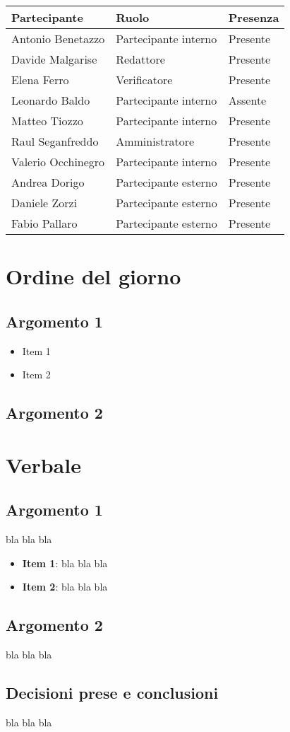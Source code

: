 \documentclass[italian,12pt]{article}
\begin{document}
\begin{flushleft}
	\begin{table}[!h]
	\begin{tabular}{ |l|l|l| } 
		\hline
		\textbf{Partecipante} & \textbf{Ruolo}       & \textbf{Presenza} \\
		\hline 
		Antonio Benetazzo     & Partecipante interno & Presente          \\
		Davide Malgarise      & Redattore            & Presente          \\
		Elena Ferro           & Verificatore         & Presente          \\
		Leonardo Baldo        & Partecipante interno & Assente           \\
		Matteo Tiozzo         & Partecipante interno & Presente          \\
		Raul Seganfreddo      & Amministratore       & Presente          \\
		Valerio Occhinegro    & Partecipante interno & Presente          \\
		Andrea Dorigo         & Partecipante esterno & Presente          \\
		Daniele Zorzi         & Partecipante esterno & Presente          \\
		Fabio Pallaro         & Partecipante esterno & Presente          \\
		\hline
	\end{tabular}
	\end{table}
\end{flushleft}

\section{Ordine del giorno}
\subsection{Argomento 1}
\begin{itemize}
	\item Item 1
	\item Item 2
\end{itemize}
\subsection{Argomento 2}

\newpage

\section{Verbale}

\subsection{Argomento 1}
bla bla bla
\begin{itemize}
	\item \textbf{Item 1}: bla bla bla
	\item \textbf{Item 2}: bla bla bla
\end{itemize}

\subsection{Argomento 2}
bla bla bla

\subsection{Decisioni prese e conclusioni}
bla bla bla
\end{document}
